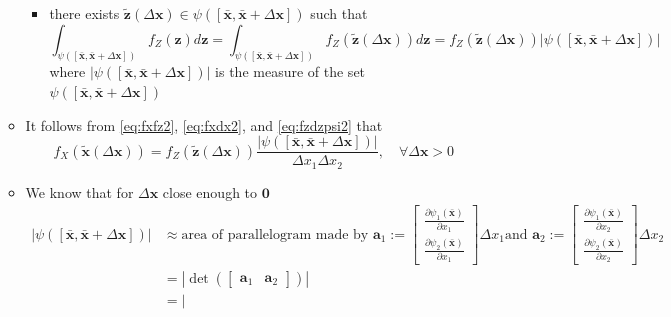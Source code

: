 \documentclass[12pt,a4paper]{article}
\begin{document}
\begin{itemize}
\begin{itemize}
\begin{itemize}
\begin{equation}
      \end{equation}
    \item there exists $\tilde{\bm{z}}(\Delta \bm{x}) \in \psi([\bar{\bm{x}},\bar{\bm{x}}+\Delta \bm{x}])$ such that
      \begin{equation}\label{eq:fzdzpsi2}%
        \int_{\psi([\bar{\bm{x}}, \bar{\bm{x}}+\Delta \bm{x}])} f_{Z}(\bm{z})d\bm{z}
        =
        \int_{\psi([\bar{\bm{x}}, \bar{\bm{x}}+\Delta \bm{x}])} f_{Z}(\tilde{\bm{z}}(\Delta \bm{x}))d\bm{z}
        =
        f_{Z}(\tilde{\bm{z}}(\Delta \bm{x}))|\psi([\bar{\bm{x}},\bar{\bm{x}}+\Delta \bm{x}])|
      \end{equation}
      where $|\psi([\bar{\bm{x}},\bar{\bm{x}}+\Delta \bm{x}])|$
        is the measure of the set $\psi([\bar{\bm{x}},\bar{\bm{x}}+\Delta \bm{x}])$
    \end{itemize}
  \item It follows from \eqref{eq:fxfz2}, \eqref{eq:fxdx2}, and \eqref{eq:fzdzpsi2} that
    \begin{equation}\nonumber%
      f_{X}(\tilde{\bm{x}}(\Delta \bm{x})) = f_{Z}(\tilde{\bm{z}}(\Delta \bm{x})) \frac{|\psi([\bar{\bm{x}},\bar{\bm{x}}+\Delta \bm{x}])|}{\Delta x_{1}\Delta x_{2}},
      \quad \forall \Delta \bm{x} >0
    \end{equation}
  \item We know that for $\Delta \bm{x}$ close enough to $\bm{0}$
    \begin{align}
      |\psi([\bar{\bm{x}},\bar{\bm{x}}+\Delta \bm{x}])|
      & \approx \textstyle \text{area of parallelogram made by
        $\bm{a}_{1}:=
        \begin{bmatrix}
          \frac{\partial \psi_{1}(\bar{\bm{x}})}{\partial x_{1}}\\
          \frac{\partial\psi_{2}(\bar{\bm{x}})}{\partial x_{1}}
        \end{bmatrix}\Delta x_{1}$
        and
        $\bm{a}_{2}:=
        \begin{bmatrix}
          \frac{\partial \psi_{1}(\bar{\bm{x}})}{\partial x_{2}}\\
          \frac{\partial\psi_{2}(\bar{\bm{x}})}{\partial x_{2}}
        \end{bmatrix}\Delta x_{2}$
        } \nonumber \\
        & = \left|\det(\begin{bmatrix} \bm{a}_{1} & \bm{a}_{2}\end{bmatrix})\right|\nonumber \\
      & = \left|

\end{align}
\end{itemize}
\end{itemize}
\end{document}
